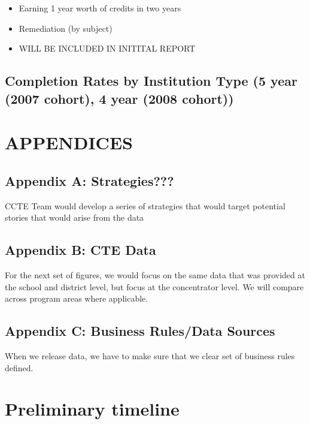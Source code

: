 \documentclass[11pt,]{article}
\providecommand{\tightlist}{%
  \setlength{\itemsep}{0pt}\setlength{\parskip}{0pt}}
\begin{document}
\begin{itemize}
\tightlist
\item
  Earning 1 year worth of credits in two years
\item
  Remediation (by subject)
\item
  WILL BE INCLUDED IN INITITAL REPORT
\end{itemize}

\subsection{Completion Rates by Institution Type (5 year (2007 cohort),
4 year (2008
cohort))}\label{completion-rates-by-institution-type-5-year-2007-cohort-4-year-2008-cohort}

\newpage

\section{APPENDICES}\label{appendices}

\subsection{Appendix A: Strategies???}\label{appendix-a-strategies}

CCTE Team would develop a series of strategies that would target
potential stories that would arise from the data

\subsection{Appendix B: CTE Data}\label{appendix-b-cte-data}

For the next set of figures, we would focus on the same data that was
provided at the school and district level, but focus at the concentrator
level. We will compare across program areas where applicable.

\subsection{Appendix C: Business Rules/Data
Sources}\label{appendix-c-business-rulesdata-sources}

When we release data, we have to make sure that we clear set of business
rules defined.

\section{Preliminary timeline}\label{preliminary-timeline}
\end{document}
